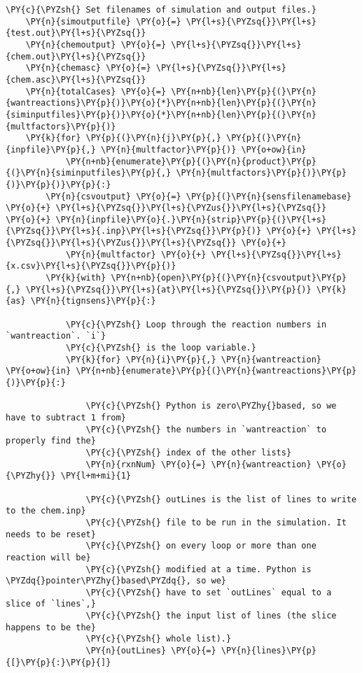 \begin{Verbatim}[commandchars=\\\{\}]
    \PY{c}{\PYZsh{} Set filenames of simulation and output files.}
    \PY{n}{simoutputfile} \PY{o}{=} \PY{l+s}{\PYZsq{}}\PY{l+s}{test.out}\PY{l+s}{\PYZsq{}}
    \PY{n}{chemoutput} \PY{o}{=} \PY{l+s}{\PYZsq{}}\PY{l+s}{chem.out}\PY{l+s}{\PYZsq{}}
    \PY{n}{chemasc} \PY{o}{=} \PY{l+s}{\PYZsq{}}\PY{l+s}{chem.asc}\PY{l+s}{\PYZsq{}}
    \PY{n}{totalCases} \PY{o}{=} \PY{n+nb}{len}\PY{p}{(}\PY{n}{wantreactions}\PY{p}{)}\PY{o}{*}\PY{n+nb}{len}\PY{p}{(}\PY{n}{siminputfiles}\PY{p}{)}\PY{o}{*}\PY{n+nb}{len}\PY{p}{(}\PY{n}{multfactors}\PY{p}{)}
    \PY{k}{for} \PY{p}{(}\PY{n}{j}\PY{p}{,} \PY{p}{(}\PY{n}{inpfile}\PY{p}{,} \PY{n}{multfactor}\PY{p}{)} \PY{o+ow}{in}
            \PY{n+nb}{enumerate}\PY{p}{(}\PY{n}{product}\PY{p}{(}\PY{n}{siminputfiles}\PY{p}{,} \PY{n}{multfactors}\PY{p}{)}\PY{p}{)}\PY{p}{)}\PY{p}{:}
        \PY{n}{csvoutput} \PY{o}{=} \PY{p}{(}\PY{n}{sensfilenamebase} \PY{o}{+} \PY{l+s}{\PYZsq{}}\PY{l+s}{\PYZus{}}\PY{l+s}{\PYZsq{}} \PY{o}{+} \PY{n}{inpfile}\PY{o}{.}\PY{n}{strip}\PY{p}{(}\PY{l+s}{\PYZsq{}}\PY{l+s}{.inp}\PY{l+s}{\PYZsq{}}\PY{p}{)} \PY{o}{+} \PY{l+s}{\PYZsq{}}\PY{l+s}{\PYZus{}}\PY{l+s}{\PYZsq{}} \PY{o}{+}
            \PY{n}{multfactor} \PY{o}{+} \PY{l+s}{\PYZsq{}}\PY{l+s}{x.csv}\PY{l+s}{\PYZsq{}}\PY{p}{)}
        \PY{k}{with} \PY{n+nb}{open}\PY{p}{(}\PY{n}{csvoutput}\PY{p}{,} \PY{l+s}{\PYZsq{}}\PY{l+s}{at}\PY{l+s}{\PYZsq{}}\PY{p}{)} \PY{k}{as} \PY{n}{tignsens}\PY{p}{:}

            \PY{c}{\PYZsh{} Loop through the reaction numbers in `wantreaction`. `i`}
            \PY{c}{\PYZsh{} is the loop variable.}
            \PY{k}{for} \PY{n}{i}\PY{p}{,} \PY{n}{wantreaction} \PY{o+ow}{in} \PY{n+nb}{enumerate}\PY{p}{(}\PY{n}{wantreactions}\PY{p}{)}\PY{p}{:}

                \PY{c}{\PYZsh{} Python is zero\PYZhy{}based, so we have to subtract 1 from}
                \PY{c}{\PYZsh{} the numbers in `wantreaction` to properly find the}
                \PY{c}{\PYZsh{} index of the other lists}
                \PY{n}{rxnNum} \PY{o}{=} \PY{n}{wantreaction} \PY{o}{\PYZhy{}} \PY{l+m+mi}{1}

                \PY{c}{\PYZsh{} outLines is the list of lines to write to the chem.inp}
                \PY{c}{\PYZsh{} file to be run in the simulation. It needs to be reset}
                \PY{c}{\PYZsh{} on every loop or more than one reaction will be}
                \PY{c}{\PYZsh{} modified at a time. Python is \PYZdq{}pointer\PYZhy{}based\PYZdq{}, so we}
                \PY{c}{\PYZsh{} have to set `outLines` equal to a slice of `lines`,}
                \PY{c}{\PYZsh{} the input list of lines (the slice happens to be the}
                \PY{c}{\PYZsh{} whole list).}
                \PY{n}{outLines} \PY{o}{=} \PY{n}{lines}\PY{p}{[}\PY{p}{:}\PY{p}{]}


\end{Verbatim}

